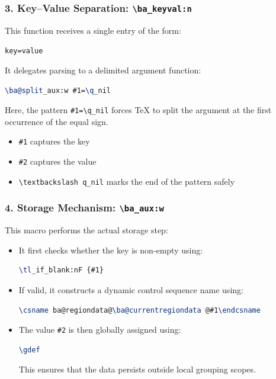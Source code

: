 \subsubsection*{3. Key–Value Separation: \texttt{\textbackslash ba\@split\_keyval:n}}

This function receives a single entry of the form:

\begin{center}
\texttt{key=value}
\end{center}

It delegates parsing to a delimited argument function:

\begin{lstlisting}[language=LaTeX]
\ba@split_aux:w #1=\q_nil
\end{lstlisting}

Here, the pattern \lstinline|#1=\q_nil| forces TeX to split the argument at the first occurrence of the equal sign.

\begin{itemize}
\item \lstinline|#1| captures the key
\item \lstinline|#2| captures the value
\item \lstinline|\textbackslash q_nil| marks the end of the pattern safely
\end{itemize}

\subsubsection*{4. Storage Mechanism: \texttt{\textbackslash ba\@split\_aux:w}}

This macro performs the actual storage step:

\begin{itemize}
\item It first checks whether the key is non-empty using:
\begin{lstlisting}[language=LaTeX]
\tl_if_blank:nF {#1}
\end{lstlisting}

\item If valid, it constructs a dynamic control sequence name using:
\begin{lstlisting}[language=LaTeX]
\csname ba@regiondata@\ba@currentregiondata @#1\endcsname
\end{lstlisting}

\item The value \lstinline|#2| is then globally assigned using:
\begin{lstlisting}[language=LaTeX]
\gdef
\end{lstlisting}

This ensures that the data persists outside local grouping scopes.
\end{itemize}

